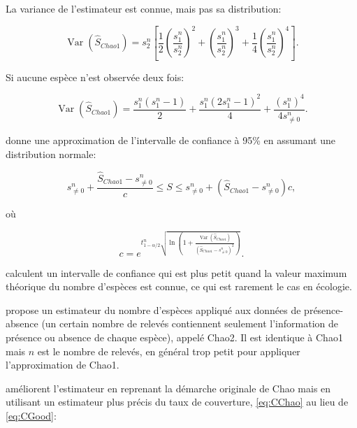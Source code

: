 \documentclass[
  11pt,
  french,
  a4paper,
  extrafontsizes,onecolumn,openright
  ]{memoir}
\begin{document}
La variance de l'estimateur est connue, mais pas sa distribution:

\begin{equation}
  \label{eq:VarChao1}
  \operatorname{Var}{\left({\hat{S}}_\mathit{Chao1}\right)} 
   = {s^{n}_{2}}\left[\frac{1}{2}{\left(\frac{s^{n}_{1}}{s^{n}_{2}}\right)}^2 + {\left(\frac{s^{n}_{1}}{s^{n}_{2}}\right)}^3 + \frac{1}{4}{\left(\frac{s^{n}_{1}}{s^{n}_{2}}\right)}^4\right].
\end{equation}

Si aucune espèce n'est observée deux fois:

\begin{equation}
  \label{eq:VarChao1sansf2}
  \operatorname{Var}{\left({\hat{S}}_\mathit{Chao1}\right)}
  = \frac{s^{n}_{1}\left(s^{n}_{1}-1\right)}{2}
  + \frac{s^{n}_{1}{\left(2s^{n}_{1} -1\right)}^2}{4}
  + \frac{{\left(s^{n}_{1}\right)}^4}{4s^{n}_{\ne 0}}.
\end{equation}

\textcite{Chao1987} donne une approximation de l'intervalle de confiance à 95\% en assumant une distribution normale:

\begin{equation}
  \label{eq:ICChao1}
  s^{n}_{\ne 0}+\frac{{\hat{S}}_\mathit{Chao1}-{s^{n}_{\ne 0}}}{c}\le S\le {s^{n}_{\ne 0}}+\left({\hat{S}}_\mathit{Chao1}-{s^{n}_{\ne 0}}\right)c,
\end{equation}

où

\begin{equation}
  \label{eq:ICChao1c}
  c=e^{t^{n}_{1-{\alpha}/{2}}\sqrt{\ln\left(1+\frac{\operatorname{Var}\left({\hat{S}}_\mathit{Chao1}\right)}{{\left({\hat{S}}_\mathit{Chao1}-{s^{n}_{\ne 0}}\right)}^2}\right)}}.
\end{equation}

\textcite[eq. 8]{Eren2012} calculent un intervalle de confiance qui est plus petit quand la valeur maximum théorique du nombre d'espèces est connue, ce qui est rarement le cas en écologie.

\textcite{Chao1987} propose un estimateur du nombre d'espèces appliqué aux données de présence-absence (un certain nombre de relevés contiennent seulement l'information de présence ou absence de chaque espèce), appelé Chao2. Il est identique à Chao1 mais \(n\) est le nombre de relevés, en général trop petit pour appliquer l'approximation de Chao1.

\textcite{Chiu2014a} améliorent l'estimateur en reprenant la démarche originale de Chao mais en utilisant un estimateur plus précis du taux de couverture, \eqref{eq:CChao} au lieu de \eqref{eq:CGood}:
\end{document}
